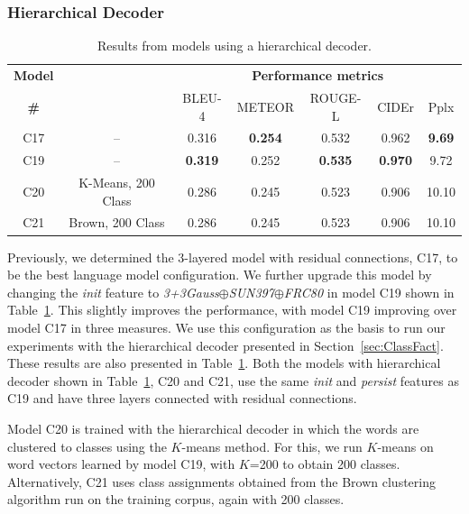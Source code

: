\subsubsection{Hierarchical Decoder}
\begin{table}[tbh]
  \centering
  \newcommand{\bs}{\small}
  \begin{adjustbox}{center}
  \begin{tabular}{|c|c|c|c|c|c|c|}
    \hline
    \bf Model & \bf \multirow{2}{*}{Class clustering} & \multicolumn{5}{c|}{\bf Performance metrics}\\
    \cline{3-7}
    \bf \# &\bf &\bs BLEU-4 &\bs METEOR &\bs ROUGE-L &\bs CIDEr&\bs Pplx \\\hline
    C17 & --    & 0.316 &\bf0.254&0.532 & 0.962   &\bf9.69  \\
    C19 & --    &\bf0.319 & 0.252 &\bf0.535 &\bf0.970 & 9.72 \\\hline
    C20 &\parbox[c][][c]{4cm}{\smallskip\centering K-Means, 200 Class \smallskip} 
                             & 0.286 & 0.245 & 0.523 & 0.906 & 10.10 \\\hline
    C21 &\parbox[c][][c]{4cm}{\smallskip\centering Brown, 200 Class\smallskip} 
                             & 0.286 & 0.245 & 0.523 & 0.906 & 10.10 \\\hline
  \end{tabular}
  \end{adjustbox}
  \caption{Results from models using a hierarchical decoder.}
  \label{tab:resClsCocValset}
\end{table}

Previously, we determined the 3-layered model with residual connections,
C17, to be the best language model configuration.
We further upgrade this model by changing the \emph{init} feature to
\emph{3+3Gauss$\oplus$SUN397$\oplus$FRC80} in model C19 shown in
Table~\ref{tab:resClsCocValset}.
This slightly improves the performance, with model C19 improving over model C17
in three measures. 
We use this configuration as the basis to run our experiments with the
hierarchical decoder presented in Section~\ref{sec:ClassFact}.
These results are also presented in Table~\ref{tab:resClsCocValset}.
Both the models with hierarchical decoder shown in
Table~\ref{tab:resClsCocValset}, C20 and C21, use the same \emph{init} and
\emph{persist} features as C19 and have three layers connected with residual
connections.

Model C20 is trained with the hierarchical decoder in which the words are
clustered to classes using the $K$-means method. 
For this, we run $K$-means on word vectors learned by model C19, with $K$=200 to
obtain 200 classes. 
Alternatively, C21 uses class assignments obtained from the Brown clustering
algorithm run on the training corpus, again with 200 classes.

